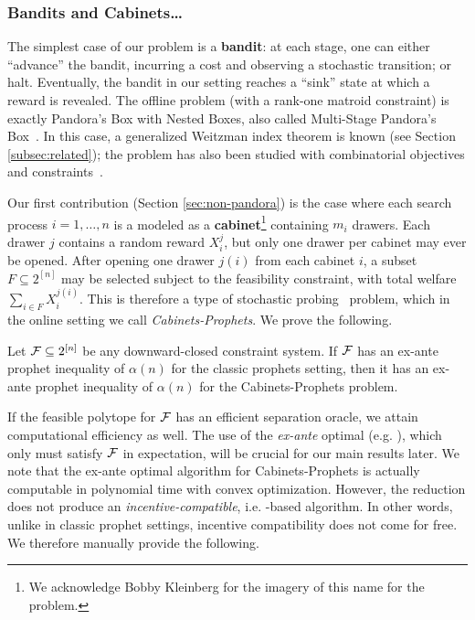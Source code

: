 \subsubsection{Bandits and Cabinets\dots}

The simplest case of our problem is a \textbf{bandit}: at each stage, one can either ``advance'' the bandit, incurring a cost and observing a stochastic transition; or halt.
Eventually, the bandit in our setting reaches a ``sink'' state at which a reward is revealed.
The offline problem (with a rank-one matroid constraint) is exactly Pandora's Box with Nested Boxes, also called Multi-Stage Pandora's Box~\citep{kleinberg2016descending,bowers2024matching}.
In this case, a generalized Weitzman index theorem is known (see Section \ref{subsec:related}); the problem has also been studied with combinatorial objectives and constraints~\citep{gupta2019markovian}.

Our first contribution (Section \ref{sec:non-pandora}) is the case where each search process $i=1,\dots,n$ is a modeled as a \textbf{cabinet}\footnote{We acknowledge Bobby Kleinberg for the imagery of this name for the problem.} containing $m_i$ drawers.
Each drawer $j$ contains a random reward $X_i^j$, but only one drawer per cabinet may ever be opened.
After opening one drawer $j(i)$ from each cabinet $i$, a subset $F \subseteq 2^{[n]}$ may be selected subject to the feasibility constraint, with total welfare $\sum_{i \in F} X_i^{j(i)}$.
This is therefore a type of stochastic probing~\citep{asadpour2016maximizing} problem, which in the online setting we call \emph{Cabinets-Prophets}.
We prove the following.

\begin{theorem*}
  Let $\mathcal{F} \subseteq 2^{[n]}$ be any downward-closed constraint system.
  If $\mathcal{F}$ has an ex-ante prophet inequality of $\alpha(n)$ for the classic prophets setting, then it has an ex-ante prophet inequality of $\alpha(n)$ for the Cabinets-Prophets problem.
\end{theorem*}
If the feasible polytope for $\mathcal{F}$ has an efficient separation oracle, we attain computational efficiency as well.
The use of the \emph{ex-ante} optimal (e.g. \citep{lee2018optimal}), which only must satisfy $\mathcal{F}$ in expectation, will be crucial for our main results later.
We note that the ex-ante optimal algorithm for Cabinets-Prophets is actually computable in polynomial time with convex optimization.
However, the reduction does not produce an \emph{incentive-compatible}, i.e. \SAUP{}-based algorithm.
In other words, unlike in classic prophet settings, incentive compatibility does not come for free.
We therefore manually provide the following.

